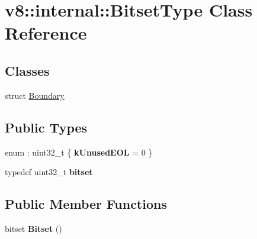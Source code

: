 \hypertarget{classv8_1_1internal_1_1_bitset_type}{}\section{v8\+:\+:internal\+:\+:Bitset\+Type Class Reference}
\label{classv8_1_1internal_1_1_bitset_type}
\subsection*{Classes}
\begin{DoxyCompactItemize}
\item 
struct \hyperlink{structv8_1_1internal_1_1_bitset_type_1_1_boundary}{Boundary}
\end{DoxyCompactItemize}
\subsection*{Public Types}
\begin{DoxyCompactItemize}
\item 
enum \+: uint32\+\_\+t \{ {\bfseries k\+Unused\+E\+OL} = 0
 \}\hypertarget{classv8_1_1internal_1_1_bitset_type_a33ba5ffa560b2a34027f0130b74a7a15}{}\label{classv8_1_1internal_1_1_bitset_type_a33ba5ffa560b2a34027f0130b74a7a15}

\item 
typedef uint32\+\_\+t {\bfseries bitset}\hypertarget{classv8_1_1internal_1_1_bitset_type_a7efc7aa457dc5f5de94d8d50b0e61f30}{}\label{classv8_1_1internal_1_1_bitset_type_a7efc7aa457dc5f5de94d8d50b0e61f30}

\end{DoxyCompactItemize}
\subsection*{Public Member Functions}
\begin{DoxyCompactItemize}
\item 
bitset {\bfseries Bitset} ()\hypertarget{classv8_1_1internal_1_1_bitset_type_a15b545e893493e75c325ee64f56bd19a}{}\label{classv8_1_1internal_1_1_bitset_type_a15b545e893493e75c325ee64f56bd19a}

\end{DoxyCompactItemize}
